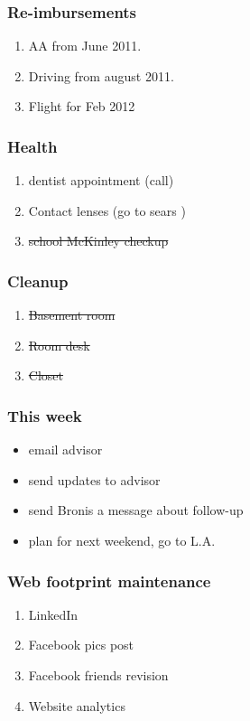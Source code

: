 \begin{frame}
\frametitle{Re-imbursements} 
\begin{enumerate} 
\item \small AA from June 2011. 
\item \small Driving from august 2011. 
\item \small Flight for Feb 2012
\end{enumerate} 
\end{frame} 

\begin{frame} 
\frametitle{Health} 
\begin{enumerate}
\item dentist appointment (call)
\item Contact lenses (go to sears )
\item \sout{school McKinley checkup}
\end{enumerate}
\end{frame} 

\begin{frame}
\frametitle{Cleanup}
\begin{enumerate}
\item \sout{Basement room}
\item \sout{Room desk}
\item \sout{Closet}
\end{enumerate} 
\end{frame}

\begin{frame}
\frametitle{This week}
\begin{itemize}
\item email advisor
\item send updates to advisor
\item send Bronis a message about follow-up
\item plan for next weekend, go to L.A. 
\end{itemize} 
\end{frame}

















\begin{frame} 
\frametitle{Web footprint maintenance}
\begin{enumerate} 
\item \small LinkedIn
\item \small Facebook pics post
\item \small Facebook friends revision
\item \small Website analytics 
\end{enumerate} 
\end{frame} 









